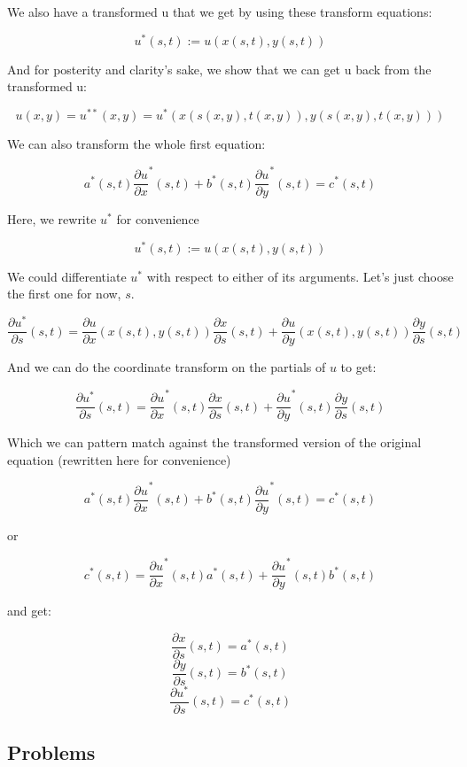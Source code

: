 \documentclass{article}
\begin{document}
We also have a transformed u that we get by using these transform equations:

$$u^*(s,t):= u(x(s,t),y(s,t))$$

And for posterity and clarity's sake, we show that we can get u back from the transformed u:

$$u(x,y) = u^{**}(x,y) = u^*(x(s(x,y),t(x,y)),y(s(x,y),t(x,y)))$$

We can also transform the whole first equation:

$$a^*(s,t) \frac{\partial u}{\partial x}^*(s,t) + b^*(s,t) \frac{\partial u}{\partial y}^*(s,t) = c^*(s,t)$$

Here, we rewrite $u^*$ for convenience

$$u^*(s,t):= u(x(s,t),y(s,t))$$

We could differentiate $u^*$ with respect to either of its arguments. Let's just choose the first one for now, $s$.

$$\frac{\partial u^*}{\partial s}(s,t) = \frac{\partial u}{\partial x}(x(s,t),y(s,t)) \frac{\partial x}{\partial s}(s,t) + \frac{\partial u}{\partial y}(x(s,t),y(s,t)) \frac{\partial y}{\partial s}(s,t)$$

And we can do the coordinate transform on the partials of $u$ to get:

$$\frac{\partial u^*}{\partial s}(s,t) = \frac{\partial u}{\partial x}^*(s,t) \frac{\partial x}{\partial s}(s,t) + \frac{\partial u}{\partial y}^*(s,t) \frac{\partial y}{\partial s}(s,t)$$

Which we can pattern match against the transformed version of the original equation (rewritten here for convenience)

$$a^*(s,t) \frac{\partial u}{\partial x}^*(s,t) + b^*(s,t) \frac{\partial u}{\partial y}^*(s,t) = c^*(s,t)$$

 or 

$$c^*(s,t)= \frac{\partial u}{\partial x}^*(s,t)a^*(s,t) +  \frac{\partial u}{\partial y}^*(s,t)b^*(s,t)$$

and get:

$$\frac{\partial x}{\partial s}(s,t) = a^*(s,t)$$
$$\frac{\partial y}{\partial s}(s,t) = b^*(s,t)$$
$$ \frac{\partial u^*}{\partial s}(s,t) = c^*(s,t)$$

\newpage

\subsection{Problems}
\end{document}
